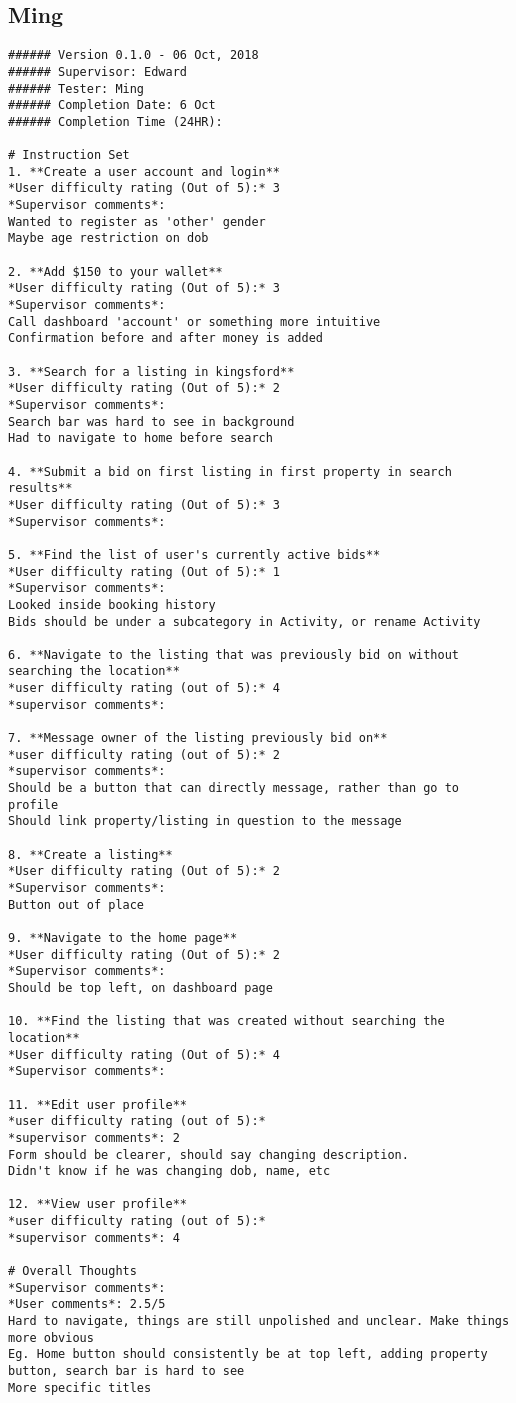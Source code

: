 \subsection{Ming}
\begin{lstlisting}
###### Version 0.1.0 - 06 Oct, 2018
###### Supervisor: Edward
###### Tester: Ming
###### Completion Date: 6 Oct
###### Completion Time (24HR):

# Instruction Set
1. **Create a user account and login**
*User difficulty rating (Out of 5):* 3
*Supervisor comments*:
Wanted to register as 'other' gender
Maybe age restriction on dob

2. **Add $150 to your wallet**
*User difficulty rating (Out of 5):* 3
*Supervisor comments*:
Call dashboard 'account' or something more intuitive
Confirmation before and after money is added

3. **Search for a listing in kingsford**
*User difficulty rating (Out of 5):* 2
*Supervisor comments*:
Search bar was hard to see in background
Had to navigate to home before search

4. **Submit a bid on first listing in first property in search results**
*User difficulty rating (Out of 5):* 3
*Supervisor comments*:

5. **Find the list of user's currently active bids**
*User difficulty rating (Out of 5):* 1
*Supervisor comments*:
Looked inside booking history
Bids should be under a subcategory in Activity, or rename Activity

6. **Navigate to the listing that was previously bid on without searching the location**
*user difficulty rating (out of 5):* 4
*supervisor comments*:

7. **Message owner of the listing previously bid on**
*user difficulty rating (out of 5):* 2
*supervisor comments*:
Should be a button that can directly message, rather than go to profile
Should link property/listing in question to the message

8. **Create a listing**
*User difficulty rating (Out of 5):* 2
*Supervisor comments*:
Button out of place

9. **Navigate to the home page**
*User difficulty rating (Out of 5):* 2
*Supervisor comments*:
Should be top left, on dashboard page

10. **Find the listing that was created without searching the location**
*User difficulty rating (Out of 5):* 4
*Supervisor comments*:

11. **Edit user profile**
*user difficulty rating (out of 5):*
*supervisor comments*: 2
Form should be clearer, should say changing description.
Didn't know if he was changing dob, name, etc

12. **View user profile**
*user difficulty rating (out of 5):*
*supervisor comments*: 4

# Overall Thoughts
*Supervisor comments*:
*User comments*: 2.5/5
Hard to navigate, things are still unpolished and unclear. Make things more obvious
Eg. Home button should consistently be at top left, adding property button, search bar is hard to see
More specific titles

\end{lstlisting}

